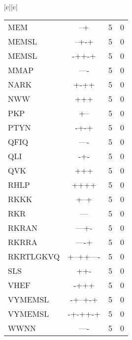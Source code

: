\documentclass[table,
12pt, %
a4paper, %
oneside, %
headinclude,footinclude, %
BCOR5mm, %
]{scrartcl}
\begin{document}
\begin{table}[htbp]
\begin{adjustbox}{totalheight=\textheight,center}
\begin{tabular}{|c||c|}
\begin{tabular}{l ccc}
MEM&--+&5&0\\
MEMSL&--+-+&5&0\\
MEMSL&-++-+&5&0\\
MMAP&----&5&0\\
NARK&+-++&5&0\\
NWW&+++&5&0\\
PKP&+--&5&0\\
PTYN&-+-+&5&0\\
QFIQ&----&5&0\\
QLI&-+-&5&0\\
QVK&+++&5&0\\
RHLP&++++&5&0\\
RKKK&+--+&5&0\\
RKR&---&5&0\\
RKRAN&---+-&5&0\\
RKRRA&----+&5&0\\
RKRTLGKVQ&+--++----&5&0\\
SLS&++-&5&0\\
VHEF&-+++&5&0\\
VYMEMSL&-+--+-+&5&0\\
VYMEMSL&-+-++-+&5&0\\
WWNN&----&5&0\\
\end{tabular} \\ \hline
\end{tabular}
\end{adjustbox}
\end{table}

\end{document}
